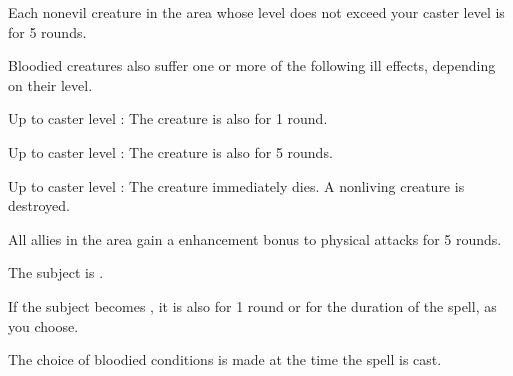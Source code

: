 \begin{spelleffect}
    Each nonevil creature in the area whose level does not exceed your caster level is \sickened for 5 rounds.

    Bloodied creatures also suffer one or more of the following ill effects, depending on their level.
    \begin{itemize*}
        \item Up to caster level : The creature is also \nauseated for 1 round.
        \item Up to caster level : The creature is also \paralyzed for 5 rounds.
        \item Up to caster level : The creature immediately dies. A nonliving creature is destroyed.
    \end{itemize*}
\end{spelleffect}

\begin{spelleffect}
    All allies in the area gain a  enhancement bonus to physical attacks for 5 rounds. \spellbonusscalingdescription
\end{spelleffect}

\spelldur{\durshort \dismissable}
\begin{spellsuccess}
    The subject is \sickened.

    If the subject becomes \bloodied, it is also \blinded for 1 round or \deafened for the duration of the spell, as you choose.
\end{spellsuccess}
\begin{spellnotes}
    The choice of bloodied conditions is made at the time the spell is cast.
\end{spellnotes}

